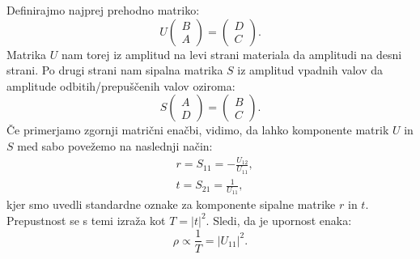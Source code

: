 \begin{appendices}
Definirajmo najprej prehodno matriko:
\begin{equation}
U
\begin{pmatrix}
B \\ A
\end{pmatrix}
=
\begin{pmatrix}
D \\ C
\end{pmatrix}.
\end{equation}
Matrika $U$ nam torej iz amplitud na levi strani materiala da amplitudi na desni strani.
Po drugi strani nam sipalna matrika $S$ iz amplitud vpadnih valov da amplitude odbitih/prepuščenih valov oziroma:
\begin{equation}
S
\begin{pmatrix}
A \\ D
\end{pmatrix}
=
\begin{pmatrix}
B \\ C
\end{pmatrix}.
\end{equation}
Če primerjamo zgornji matrični enačbi, vidimo, da lahko komponente matrik $U$ in $S$ med sabo povežemo na naslednji način:
\begin{align}
&r = S_{11} = -\frac{U_{12}}{U_{11}}, \\
&t = S_{21} = \frac{1}{U_{11}},
\end{align}
kjer smo uvedli standardne oznake za komponente sipalne matrike $r$ in $t$. Prepustnost se s temi izraža kot
$T = |t|^2$.
Sledi, da je upornost enaka:
\begin{equation}
\rho \propto \frac{1}{T} = |U_{11}|^2.
\end{equation}


\end{appendices}
